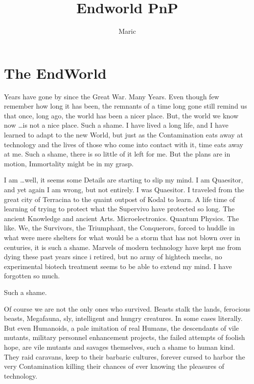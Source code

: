 \documentclass{book}
\title{Endworld PnP}
\author{Maric}
\date{}
\begin{document}
    \maketitle
    \tableofcontents
    \chapter{The EndWorld}\label{ch:theendworld}

    Years have gone by since the Great War.
    Many Years.
    Even though few remember how long it has been, the remnants of a time long gone still remind us that once,
    long ago, the world has been a nicer place.
    But, the world we know now \ldots is not a nice place.
    Such a shame.
    I have lived a long life, and I have learned to adapt to the new World,
    but just as the Contamination eats away at technology and the lives of those who come into contact with it, time
    eats away at me.
    Such a shame, there is so little of it left for me.
    But the plans are in motion, Immortality might be in my grasp.\par
    I am \ldots well, it seems some Details are starting to slip my mind.
    I am Quaesitor, and yet again I am wrong, but not entirely.
    I was Quaesitor.
    I traveled from the great city of Terracina to the quaint outpost of Kodal to learn.
    A life time of learning of trying to protect what the Supervivo have protected so long.
    The ancient Knowledge and ancient Arts.
    Microelectronics.
    Quantum Physics.
    The like.
    We, the Survivors, the Triumphant, the Conquerors,
    forced to huddle in what were mere shelters for what would be a storm that has not blown over in centuries,
    it is such a shame.
    Marvels of modern technology have kept me from dying these past years since i retired,
    but no army of hightech mechs, no experimental biotech treatment seems to be able to extend my mind.
    I have forgotten so much.
    \par Such a shame.\par
    Of course we are not the only ones who survived.
    Beasts stalk the lands, ferocious beasts, Megafauna, sly, intelligent and hungry creatures.
    In some cases literally.
    But even Humanoids, a pale imitation of real Humans, the descendants of vile mutants,
    military personnel enhancement projects, the failed attempts of foolish hope,
    are vile mutants and savages themselves, such a shame to human kind.
    They raid caravans, keep to their barbaric cultures,
    forever cursed to harbor the very Contamination killing their chances of ever knowing the pleasures of technology.
\end{document}
